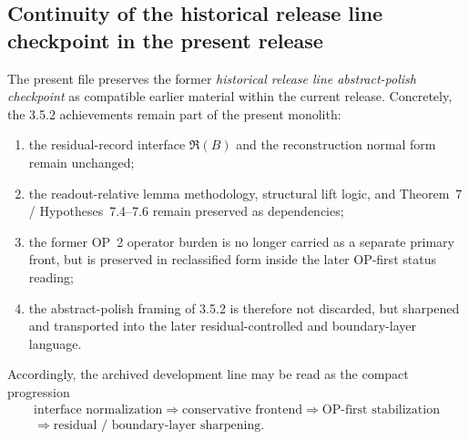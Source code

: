 \documentclass[12pt,a4paper]{article}
\DeclareRobustCommand{\QSCver}[1]{archival stage}
\renewcommand{\QSCver}[1]{historical release line}
\begin{document}
\subsection*{Continuity of the \QSCver{legacy.5.2} checkpoint in the present release}
The present file preserves the former \emph{\QSCver{legacy.5.2} abstract-polish checkpoint} as compatible earlier material within the current release.
Concretely, the 3.5.2 achievements remain part of the present monolith:
\begin{enumerate}[leftmargin=2em,label=(\roman*)]
 \item the residual-record interface \(\mathfrak R(B)\) and the reconstruction normal form remain unchanged;
 \item the readout-relative lemma methodology, structural lift logic, and Theorem~7 / Hypotheses~7.4--7.6 remain preserved as dependencies;
 \item the former OP~2 operator burden is no longer carried as a separate primary front, but is preserved in reclassified form inside the later OP-first status reading;
 \item the abstract-polish framing of 3.5.2 is therefore not discarded, but sharpened and transported into the later residual-controlled and boundary-layer language.
\end{enumerate}
Accordingly, the archived development line may be read as the compact progression
\[
\begin{gathered}
\text{interface normalization}
\Longrightarrow
\text{conservative frontend}
\Longrightarrow
\text{OP-first stabilization}\\[0.2em]
\Longrightarrow
\text{residual / boundary-layer sharpening}.
\end{gathered}
\]
\end{document}
